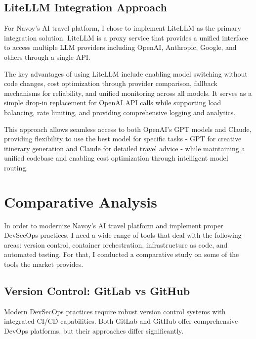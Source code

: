 \subsection{LiteLLM Integration Approach}
For Navoy's AI travel platform, I chose to implement LiteLLM as the primary integration solution. LiteLLM is a proxy service that provides a unified interface to access multiple LLM providers including OpenAI, Anthropic, Google, and others through a single API.

The key advantages of using LiteLLM include enabling model switching without code changes, cost optimization through provider comparison, fallback mechanisms for reliability, and unified monitoring across all models. It serves as a simple drop-in replacement for OpenAI API calls while supporting load balancing, rate limiting, and providing comprehensive logging and analytics.

This approach allows seamless access to both OpenAI's GPT models and Claude, providing flexibility to use the best model for specific tasks - GPT for creative itinerary generation and Claude for detailed travel advice - while maintaining a unified codebase and enabling cost optimization through intelligent model routing.

\section{Comparative Analysis}
In order to modernize Navoy's AI travel platform and implement proper DevSecOps practices, I need a wide range of tools that deal with the following areas: version control, container orchestration, infrastructure as code, and automated testing. For that, I conducted a comparative study on some of the tools the market provides.

\subsection{Version Control: GitLab vs GitHub}
Modern DevSecOps practices require robust version control systems with integrated CI/CD capabilities. Both GitLab and GitHub offer comprehensive DevOps platforms, but their approaches differ significantly.

